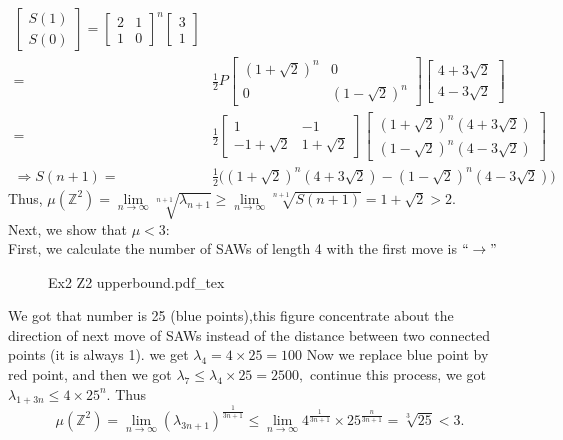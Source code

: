 \documentclass[12pt,a4paper]{article}
\newcommand{\incfig}[1]{%
{#1.pdf_tex}
}
\begin{document}
\begin{enumerate}
\begin{enumerate}
\begin{align*}
\begin{bmatrix}
	    S(1)\\
	    S(0)
	    \end{bmatrix}=\begin{bmatrix}
	    2 & 1\\
	    1 & 0
	    \end{bmatrix}^n\begin{bmatrix}
	    3\\
	    1
	    \end{bmatrix}\\
	    =& \frac{1}{2}P\begin{bmatrix}
	    (1+\sqrt{2})^n & 0\\
	    0 & (1-\sqrt{2})^n
	    \end{bmatrix}\begin{bmatrix}
	    4+3\sqrt{2}\\
	    4-3\sqrt{2}
	    \end{bmatrix}\\
	    =& \frac{1}{2}\begin{bmatrix}
	    1 & -1\\
	    -1+\sqrt{2} & 1+\sqrt{2}
	    \end{bmatrix}\begin{bmatrix}
	    (1+\sqrt{2})^n(4+3\sqrt{2})\\
	    (1-\sqrt{2})^n(4-3\sqrt{2})
	    \end{bmatrix}\\
	    \Rightarrow S(n+1)=& \frac{1}{2}\Big((1+\sqrt{2})^n(4+3\sqrt{2})-(1-\sqrt{2})^n(4-3\sqrt{2})\Big)
	    \end{align*}
	    Thus, $\mu(\mathbb{Z}^2)=\lim\limits_{n\to\infty}\sqrt[n+1]{\lambda_{n+1}}\geq \lim\limits_{n\to\infty}\sqrt[n+1]{S(n+1)}=1+\sqrt{2}>2.$\\[5pt]
	    Next, we show that $\mu<3:$\\
	    First, we calculate the number of SAWs of length 4 with the first move is $``\rightarrow"$
	    \newpage
		\begin{figure}[htp]
		\centering
		\def\svgwidth{8cm}
		\incfig{Ex2 Z2 upperbound}
		\end{figure}
		We got that number is 25 (blue points),this figure concentrate about the direction of next move of SAWs instead of the distance between two connected points (it is always 1). we get $\lambda_{4}=4\times 25=100$ Now we replace blue point by red point, and then we got $\lambda_7\leq \lambda_4\times 25=2500,$ continue this process, we got $\lambda_{1+3n}\leq 4\times 25^n.$ Thus 
		\[
		\mu(\mathbb{Z}^2)=\lim_{n\to\infty}(\lambda_{3n+1})^{\frac{1}{3n+1}}\leq \lim_{n\to\infty}4^{\frac{1}{3n+1}}\times 25^{\frac{n}{3n+1}}=\sqrt[3]{25}<3.
\]
\end{enumerate}
\end{enumerate}
\end{document}

